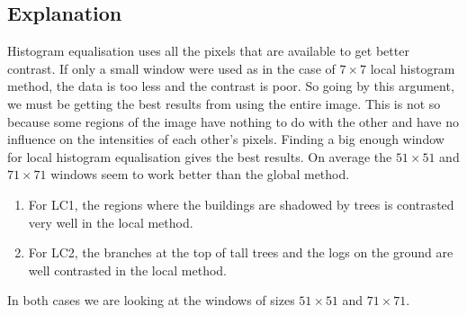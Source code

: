 \documentclass[12pt]{article}
\begin{document}
    \subsection*{Explanation}
    Histogram equalisation uses all the pixels that are available to get better contrast. If only a small window were
    used as in the case of $7 \times 7$ local histogram method, the data is too less and the contrast is poor. So going 
    by this argument, we must be getting the best results from using the entire image. This is not so because some regions
    of the image have nothing to do with the other and have no influence on the intensities of each other's pixels. Finding 
    a big enough window for local histogram equalisation gives the best results. On average the $51 \times 51$ and 
    $71 \times 71$ windows seem to work better than the global method.
    \begin{enumerate}
        \item For LC1, the regions where the buildings are shadowed by trees is contrasted very well in the local method. 
        \item For LC2, the branches at the top of tall trees and the logs on the ground are well contrasted in the local method.
    \end{enumerate}
    In both cases we are looking at the windows of sizes $51 \times 51$ and $71 \times 71$.
\end{document}
